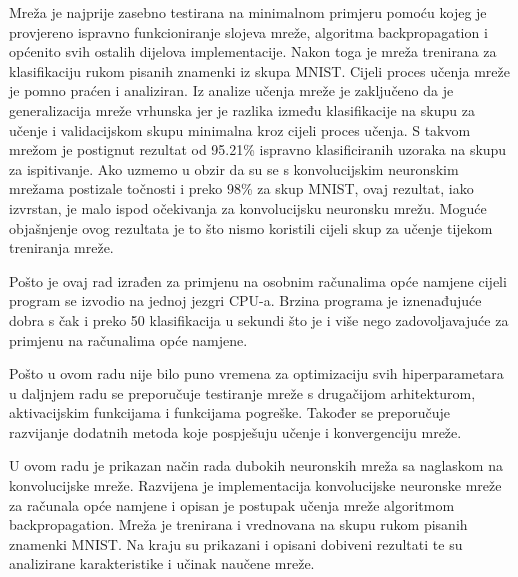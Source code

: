 \documentclass[times, utf8, zavrsni, numeric]{fer}
\begin{document}
Mreža je najprije zasebno testirana na minimalnom primjeru pomoću kojeg je provjereno ispravno funkcioniranje slojeva mreže, algoritma backpropagation i općenito svih ostalih dijelova implementacije. Nakon toga je mreža trenirana za klasifikaciju rukom pisanih znamenki iz skupa MNIST. Cijeli proces učenja mreže je pomno praćen i analiziran. Iz analize učenja mreže je zaključeno da je generalizacija mreže vrhunska jer je razlika između klasifikacije na skupu za učenje i validacijskom skupu minimalna kroz cijeli proces učenja. S takvom mrežom je postignut rezultat od 95.21\% ispravno klasificiranih uzoraka na skupu za ispitivanje. Ako uzmemo u obzir da su se s konvolucijskim neuronskim mrežama postizale točnosti i preko 98\% za skup MNIST, ovaj rezultat, iako izvrstan, je malo ispod očekivanja za konvolucijsku neuronsku mrežu. Moguće objašnjenje ovog rezultata je to što nismo koristili cijeli skup za učenje tijekom treniranja mreže.

Pošto je ovaj rad izrađen za primjenu na osobnim računalima opće namjene cijeli program se izvodio na jednoj jezgri CPU-a. Brzina programa je iznenađujuće dobra s čak i preko 50 klasifikacija u sekundi što je i više nego zadovoljavajuće za primjenu na računalima opće namjene.

Pošto u ovom radu nije bilo puno vremena za optimizaciju svih hiperparametara u daljnjem radu se preporučuje testiranje mreže s drugačijom arhitekturom, aktivacijskim funkcijama i funkcijama pogreške. Također se preporučuje razvijanje dodatnih metoda koje pospješuju učenje i konvergenciju mreže.





\begin{sazetak}
U ovom radu je prikazan način rada dubokih neuronskih mreža sa naglaskom na konvolucijske mreže. Razvijena je implementacija konvolucijske neuronske mreže za računala opće namjene i opisan je postupak učenja mreže algoritmom backpropagation. Mreža je trenirana i vrednovana na skupu rukom pisanih znamenki MNIST. Na kraju su prikazani i opisani dobiveni rezultati te su analizirane karakteristike i učinak naučene mreže.

\end{sazetak}
\end{document}

